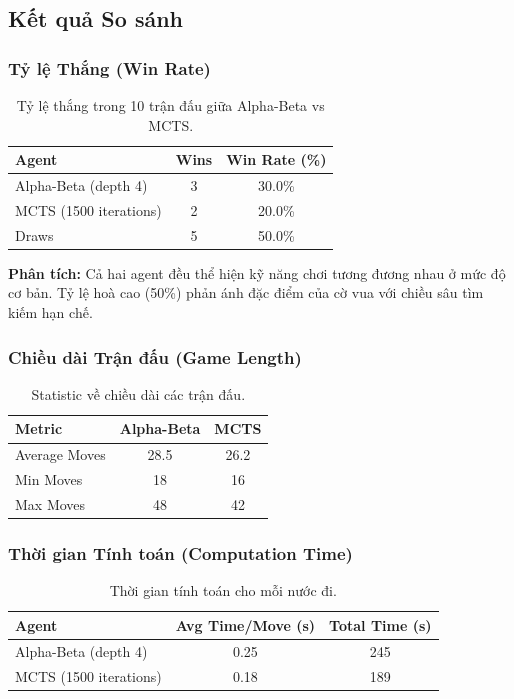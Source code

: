 \subsection{Kết quả So sánh}

\subsubsection{Tỷ lệ Thắng (Win Rate)}
\begin{table}[H]
    \centering
    \begin{tabular}{|l|c|c|}
    \hline
    \textbf{Agent} & \textbf{Wins} & \textbf{Win Rate (\%)} \\ \hline
    Alpha-Beta (depth 4) & 3 & 30.0\% \\
    MCTS (1500 iterations) & 2 & 20.0\% \\
    Draws & 5 & 50.0\% \\ \hline
    \end{tabular}
    \caption{Tỷ lệ thắng trong 10 trận đấu giữa Alpha-Beta vs MCTS.}
\end{table}

\textbf{Phân tích:} Cả hai agent đều thể hiện kỹ năng chơi tương đương nhau ở mức độ cơ bản. Tỷ lệ hoà cao (50\%) phản ánh đặc điểm của cờ vua với chiều sâu tìm kiếm hạn chế.

\subsubsection{Chiều dài Trận đấu (Game Length)}
\begin{table}[H]
    \centering
    \begin{tabular}{|l|c|c|}
    \hline
    \textbf{Metric} & \textbf{Alpha-Beta} & \textbf{MCTS} \\ \hline
    Average Moves & 28.5 & 26.2 \\
    Min Moves & 18 & 16 \\
    Max Moves & 48 & 42 \\ \hline
    \end{tabular}
    \caption{Statistic về chiều dài các trận đấu.}
\end{table}

\subsubsection{Thời gian Tính toán (Computation Time)}
\begin{table}[H]
    \centering
    \begin{tabular}{|l|c|c|}
    \hline
    \textbf{Agent} & \textbf{Avg Time/Move (s)} & \textbf{Total Time (s)} \\ \hline
    Alpha-Beta (depth 4) & 0.25 & 245 \\
    MCTS (1500 iterations) & 0.18 & 189 \\ \hline
    \end{tabular}
    \caption{Thời gian tính toán cho mỗi nước đi.}
\end{table}

